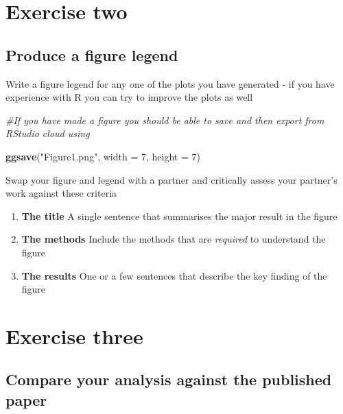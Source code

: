 \documentclass[
]{book}
\newenvironment{Shaded}{\begin{snugshade}}{\end{snugshade}}
\newcommand{\AttributeTok}[1]{\textcolor[rgb]{0.13,0.29,0.53}{#1}}
\newcommand{\CommentTok}[1]{\textcolor[rgb]{0.56,0.35,0.01}{\textit{#1}}}
\newcommand{\DecValTok}[1]{\textcolor[rgb]{0.00,0.00,0.81}{#1}}
\newcommand{\FunctionTok}[1]{\textcolor[rgb]{0.13,0.29,0.53}{\textbf{#1}}}
\newcommand{\NormalTok}[1]{#1}
\newcommand{\StringTok}[1]{\textcolor[rgb]{0.31,0.60,0.02}{#1}}
\begin{document}
\hypertarget{exercise-two}{%
\section{Exercise two}\label{exercise-two}}

\hypertarget{produce-a-figure-legend}{%
\subsection{Produce a figure legend}\label{produce-a-figure-legend}}

Write a figure legend for any one of the plots you have generated - if you have experience with R you can try to improve the plots as well

\begin{Shaded}
\begin{Highlighting}[]
\CommentTok{\#If you have made a figure you should be able to save and then export from RStudio cloud using}

\FunctionTok{ggsave}\NormalTok{(}\StringTok{"Figure1.png"}\NormalTok{, }\AttributeTok{width =} \DecValTok{7}\NormalTok{, }\AttributeTok{height =} \DecValTok{7}\NormalTok{)}
\end{Highlighting}
\end{Shaded}

Swap your figure and legend with a partner and critically assess your partner's work against these criteria

\begin{enumerate}
\def\labelenumi{\arabic{enumi}.}
\item
  \textbf{The title} A single sentence that summarises the major result in the figure
\item
  \textbf{The methods} Include the methods that are \emph{required} to understand the figure
\item
  \textbf{The results} One or a few sentences that describe the key finding of the figure
\end{enumerate}

\hypertarget{exercise-three}{%
\section{Exercise three}\label{exercise-three}}

\hypertarget{compare-your-analysis-against-the-published-paper}{%
\subsection{Compare your analysis against the published paper}\label{compare-your-analysis-against-the-published-paper}}
\end{document}
